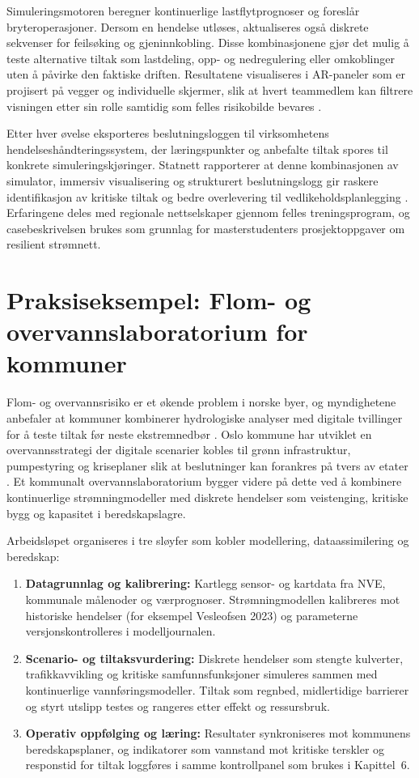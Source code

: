 Simuleringsmotoren beregner kontinuerlige lastflytprognoser og foreslår bryteroperasjoner. Dersom en hendelse utløses, aktualiseres også diskrete sekvenser for feilsøking og gjeninnkobling. Disse kombinasjonene gjør det mulig å teste alternative tiltak som lastdeling, opp- og nedregulering eller omkoblinger uten å påvirke den faktiske driften. Resultatene visualiseres i AR-paneler som er projisert på vegger og individuelle skjermer, slik at hvert teammedlem kan filtrere visningen etter sin rolle samtidig som felles risikobilde bevares \citep{kongsberg2023kognitwin}.

Etter hver øvelse eksporteres beslutningsloggen til virksomhetens hendelseshåndteringssystem, der læringspunkter og anbefalte tiltak spores til konkrete simuleringskjøringer. Statnett rapporterer at denne kombinasjonen av simulator, immersiv visualisering og strukturert beslutningslogg gir raskere identifikasjon av kritiske tiltak og bedre overlevering til vedlikeholdsplanlegging \citep{statnett2024kontrolltarn}. Erfaringene deles med regionale nettselskaper gjennom felles treningsprogram, og casebeskrivelsen brukes som grunnlag for masterstudenters prosjektoppgaver om resilient strømnett.

\section{Praksiseksempel: Flom- og overvannslaboratorium for kommuner}
Flom- og overvannsrisiko er et økende problem i norske byer, og myndighetene anbefaler at kommuner kombinerer hydrologiske analyser med digitale tvillinger for å teste tiltak før neste ekstremnedbør \citep{nve2022kommunal,dsb2022beredskap}. Oslo kommune har utviklet en overvannsstrategi der digitale scenarier kobles til grønn infrastruktur, pumpestyring og kriseplaner slik at beslutninger kan forankres på tvers av etater \citep{oslo2023overvann}. Et kommunalt overvannslaboratorium bygger videre på dette ved å kombinere kontinuerlige strømningmodeller med diskrete hendelser som veistenging, kritiske bygg og kapasitet i beredskapslagre.

Arbeidsløpet organiseres i tre sløyfer som kobler modellering, dataassimilering og beredskap:
\begin{enumerate}
    \item \textbf{Datagrunnlag og kalibrering:} Kartlegg sensor- og kartdata fra NVE, kommunale målenoder og værprognoser. Strømningmodellen kalibreres mot historiske hendelser (for eksempel Vesleofsen 2023) og parameterne versjonskontrolleres i modelljournalen.
    \item \textbf{Scenario- og tiltaksvurdering:} Diskrete hendelser som stengte kulverter, trafikkavvikling og kritiske samfunnsfunksjoner simuleres sammen med kontinuerlige vannføringsmodeller. Tiltak som regnbed, midlertidige barrierer og styrt utslipp testes og rangeres etter effekt og ressursbruk.
    \item \textbf{Operativ oppfølging og læring:} Resultater synkroniseres mot kommunens beredskapsplaner, og indikatorer som vannstand mot kritiske terskler og responstid for tiltak loggføres i samme kontrollpanel som brukes i Kapittel~6.
\end{enumerate}


